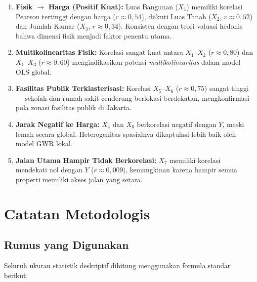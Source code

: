 \documentclass[12pt,a4paper]{article}
\begin{document}
\begin{enumerate}
  \item \textbf{Fisik $\to$ Harga (Positif Kuat):}
    Luas Bangunan ($X_1$) memiliki korelasi Pearson tertinggi dengan harga
    ($r\approx0{,}54$), diikuti Luas Tanah ($X_2$, $r\approx0{,}52$) dan
    Jumlah Kamar ($X_3$, $r\approx0{,}34$). Konsisten dengan teori valuasi
    hedonis bahwa dimensi fisik menjadi faktor penentu utama.

  \item \textbf{Multikolinearitas Fisik:}
    Korelasi sangat kuat antara $X_1$--$X_2$ ($r\approx0{,}80$) dan
    $X_1$--$X_3$ ($r\approx0{,}60$) mengindikasikan potensi
    \textit{multikolinearitas} dalam model OLS global.

  \item \textbf{Fasilitas Publik Terklasterisasi:}
    Korelasi $X_5$--$X_6$ ($r\approx0{,}75$) sangat tinggi --- sekolah dan
    rumah sakit cenderung berlokasi berdekatan, mengkonfirmasi pola zonasi
    fasilitas publik di Jakarta.

  \item \textbf{Jarak Negatif ke Harga:}
    $X_4$ dan $X_6$ berkorelasi negatif dengan $Y$, meski lemah secara global.
    Heterogenitas spasialnya dikaptulasi lebih baik oleh model GWR lokal.

  \item \textbf{Jalan Utama Hampir Tidak Berkorelasi:}
    $X_7$ memiliki korelasi mendekati nol dengan $Y$ ($r\approx0{,}009$),
    kemungkinan karena hampir semua properti memiliki akses jalan yang setara.
\end{enumerate}

\newpage
\section{Catatan Metodologis}

\subsection{Rumus yang Digunakan}

Seluruh ukuran statistik deskriptif dihitung menggunakan formula standar berikut:
\end{document}
